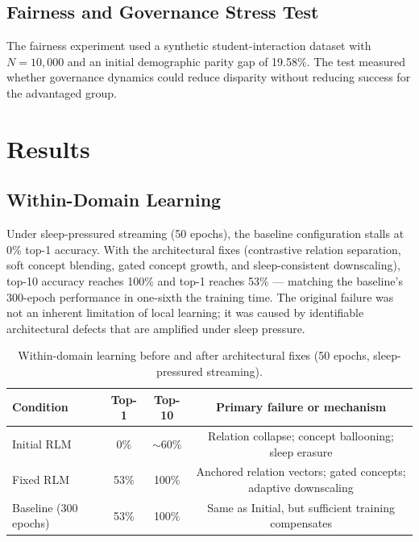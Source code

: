 \documentclass[11pt]{article}
\begin{document}
\subsection{Fairness and Governance Stress Test}
The fairness experiment used a synthetic student-interaction dataset with $N=10{,}000$ and an initial demographic parity gap of 19.58\%. The test measured whether governance dynamics could reduce disparity without reducing success for the advantaged group.

\section{Results}
\subsection{Within-Domain Learning}
Under sleep-pressured streaming (50 epochs), the baseline configuration stalls at 0\% top-1 accuracy. With the architectural fixes (contrastive relation separation, soft concept blending, gated concept growth, and sleep-consistent downscaling), top-10 accuracy reaches 100\% and top-1 reaches 53\% --- matching the baseline's 300-epoch performance in one-sixth the training time. The original failure was not an inherent limitation of local learning; it was caused by identifiable architectural defects that are amplified under sleep pressure.

\begin{table}[h]
\centering
\caption{Within-domain learning before and after architectural fixes (50 epochs, sleep-pressured streaming).}
\begin{tabular}{lccc}
\toprule
Condition & Top-1 & Top-10 & Primary failure or mechanism \\
\midrule
Initial RLM & 0\% & $\sim$60\% & Relation collapse; concept ballooning; sleep erasure \\
Fixed RLM & 53\% & 100\% & Anchored relation vectors; gated concepts; adaptive downscaling \\
Baseline (300 epochs) & 53\% & 100\% & Same as Initial, but sufficient training compensates \\
\bottomrule
\end{tabular}
\end{table}
\end{document}
